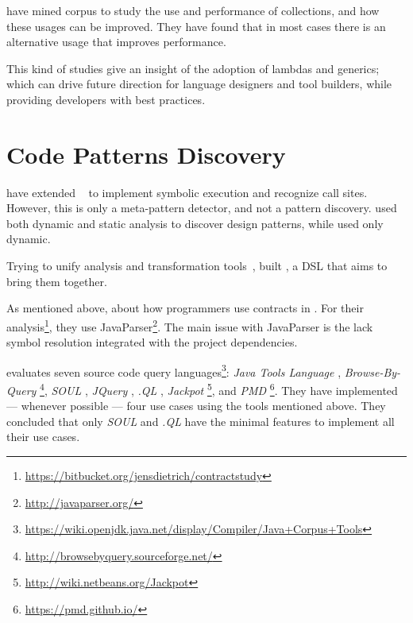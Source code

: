 \cite{costaEmpiricalStudyUsage2017} have mined \github{} corpus to study the use and performance of collections, and how these usages can be improved.
They have found
that in most cases there is an alternative usage that improves performance.

This kind of studies give an insight of the adoption of lambdas and generics; which can drive future direction for language designers and tool builders, while providing developers with best practices.

\section{Code Patterns Discovery }
\label{sec:lr:patterns}

\cite{posnettTHEXMiningMetapatterns2010} have extended \asm{}~\citep{brunetonASMCodeManipulation2002,kuleshovUsingASMFramework2007} to implement symbolic execution and recognize call sites.
However, this is only a meta-pattern detector, and not a pattern discovery.
\cite{huDynamicAnalysisDesign2008} used both dynamic and static analysis to discover design patterns, while \cite{arcelliDesignPatternDetection2008} used only dynamic.

Trying to unify analysis and transformation tools~\cite{vinjuHowMakeBridge2006}, \cite{klintRASCALDomainSpecific2009} built \rascal, a DSL that aims to bring them together.

As mentioned above, \cite{dietrichContractsWildStudy2017a}  about how programmers use contracts in \mavencentral{}.
For their analysis\footnote{\url{https://bitbucket.org/jensdietrich/contractstudy}},
they  use JavaParser\footnote{\url{http://javaparser.org/}}.
The main issue with JavaParser is the lack \underline{} symbol resolution integrated with the project dependencies.

\cite{urmaProgrammingLanguageEvolution2012} evaluates seven source code query languages\footnote{\url{https://wiki.openjdk.java.net/display/Compiler/Java+Corpus+Tools}}:
\emph{Java Tools Language} \cite{cohenJTLJavaTools},
\emph{Browse-By-Query} \footnote{\url{http://browsebyquery.sourceforge.net/}},
\emph{SOUL} \cite{derooverSOULToolSuite2011},
\emph{JQuery} \cite{volderJqueryGenericCode2006},
\emph{.QL} \cite{moorKeynoteAddressQL2007} ,
\emph{Jackpot} \footnote{\url{http://wiki.netbeans.org/Jackpot}}, and
\emph{PMD} \footnote{\url{https://pmd.github.io/}}.
They have implemented --- whenever possible --- four use cases using the tools mentioned above.
They concluded that only \emph{SOUL} and \emph{.QL} have the minimal features to implement all their use cases.

